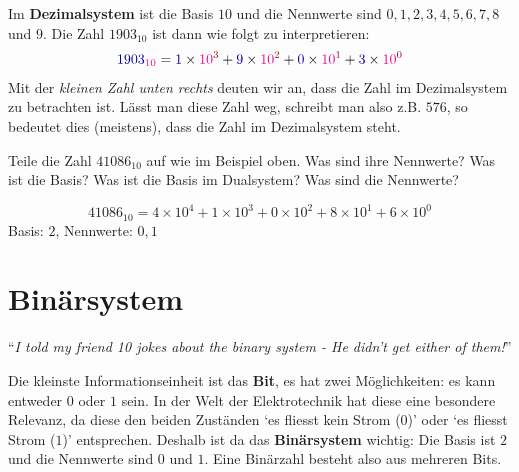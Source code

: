 Im \textbf{Dezimalsystem} ist die Basis $10$ und die Nennwerte sind $0,1,2,3,4,5,6,7,8$ und $9$. Die Zahl $1903_{10}$ ist dann wie folgt zu interpretieren:
\begin{align}
	\label{equ dezimalzahl in basis und nennwerten}
	\textcolor{blue}{1903}_{\textcolor{magenta}{10}}
	= \textcolor{blue}{1}\times \textcolor{magenta}{10}^{\textcolor{red}{3}} 
	+ \textcolor{blue}{9}\times \textcolor{magenta}{10}^{\textcolor{red}{2}} 
	+ \textcolor{blue}{0}\times \textcolor{magenta}{10}^{\textcolor{red}{1}} 
	+ \textcolor{blue}{3}\times \textcolor{magenta}{10}^{\textcolor{red}{0}}
\end{align}
Mit der \textit{kleinen Zahl unten rechts} deuten wir an, dass die Zahl im Dezimalsystem zu betrachten ist. Lässt man diese Zahl weg, schreibt man also z.B. $576$, so bedeutet dies (meistens), dass die Zahl im Dezimalsystem steht.


\begin{question}
	\begin{tasks}
		\task Teile die Zahl $\num{41086}_{10}$ auf wie im Beispiel oben. Was sind ihre Nennwerte? Was ist die Basis?
		\task Was ist die Basis im Dualsystem? Was sind die Nennwerte?
	\end{tasks}
	\grid{12.2}
\end{question}
\begin{solution}
	\begin{tasks}
		\task $$\num{41086}_{10}
		= 4 \times 10^4 +
		  1 \times 10^3 +
		  0 \times 10^2 +
		  8 \times 10^1 +
		  6 \times 10^0
		$$
		\task Basis: $2$, Nennwerte: $0,1$
	\end{tasks}
\end{solution}

\newpage

\section{Binärsystem}

\begin{center}
	``\textit{I told my friend 10 jokes about the binary system - He didn't get either of them!}''	
\end{center}

\begin{definition}
	Die kleinste Informationseinheit ist das \textbf{Bit}, es hat zwei Möglichkeiten: es kann entweder $0$ oder $1$ sein. In der Welt der Elektrotechnik hat diese eine besondere Relevanz, da diese den beiden Zuständen `es fliesst kein Strom ($0$)' oder `es fliesst Strom ($1$)' entsprechen. Deshalb ist da das \textbf{Binärsystem} wichtig: Die Basis ist $2$ und die Nennwerte sind $0$ und $1$. Eine Binärzahl besteht also aus mehreren Bits.
\end{definition}

